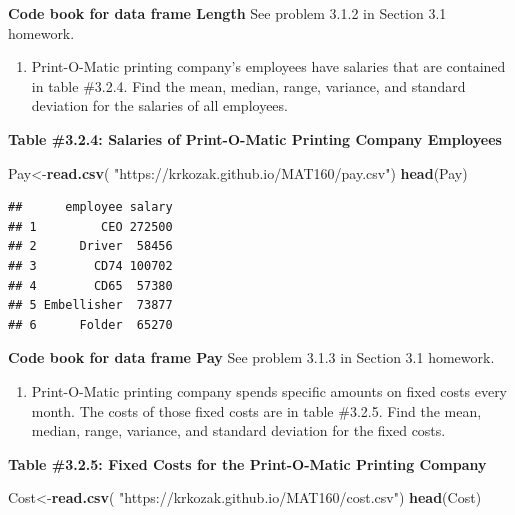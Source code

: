 \documentclass[
]{book}
\newenvironment{Shaded}{\begin{snugshade}}{\end{snugshade}}
\newcommand{\KeywordTok}[1]{\textcolor[rgb]{0.13,0.29,0.53}{\textbf{#1}}}
\newcommand{\NormalTok}[1]{#1}
\newcommand{\StringTok}[1]{\textcolor[rgb]{0.31,0.60,0.02}{#1}}
\providecommand{\tightlist}{%
  \setlength{\itemsep}{0pt}\setlength{\parskip}{0pt}}
\begin{document}
\textbf{Code book for data frame Length} See problem 3.1.2 in Section 3.1 homework.

\begin{enumerate}
\def\labelenumi{\arabic{enumi}.}
\setcounter{enumi}{2}
\tightlist
\item
  Print-O-Matic printing company's employees have salaries that are contained in table \#3.2.4. Find the mean, median, range, variance, and standard deviation for the salaries of all employees.
\end{enumerate}

\textbf{Table \#3.2.4: Salaries of Print-O-Matic Printing Company Employees}

\begin{Shaded}
\begin{Highlighting}[]
\NormalTok{Pay<-}\KeywordTok{read.csv}\NormalTok{(}
  \StringTok{"https://krkozak.github.io/MAT160/pay.csv"}\NormalTok{)}
\KeywordTok{head}\NormalTok{(Pay)}
\end{Highlighting}
\end{Shaded}

\begin{verbatim}
##      employee salary
## 1         CEO 272500
## 2      Driver  58456
## 3        CD74 100702
## 4        CD65  57380
## 5 Embellisher  73877
## 6      Folder  65270
\end{verbatim}

\textbf{Code book for data frame Pay} See problem 3.1.3 in Section 3.1 homework.

\begin{enumerate}
\def\labelenumi{\arabic{enumi}.}
\setcounter{enumi}{3}
\tightlist
\item
  Print-O-Matic printing company spends specific amounts on fixed costs every month. The costs of those fixed costs are in table \#3.2.5. Find the mean, median, range, variance, and standard deviation for the fixed costs.
\end{enumerate}

\textbf{Table \#3.2.5: Fixed Costs for the Print-O-Matic Printing Company}

\begin{Shaded}
\begin{Highlighting}[]
\NormalTok{Cost<-}\KeywordTok{read.csv}\NormalTok{(}
  \StringTok{"https://krkozak.github.io/MAT160/cost.csv"}\NormalTok{)}
\KeywordTok{head}\NormalTok{(Cost)}
\end{Highlighting}
\end{Shaded}
\end{document}
